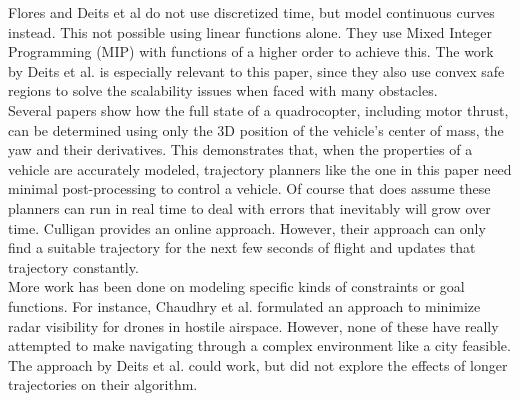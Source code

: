 Flores\cite{Flores2007} and Deits et al\cite{Deits2015} do not use discretized time, but model continuous curves instead. This not possible using linear functions alone. They use Mixed Integer Programming (MIP) with functions of a higher order to achieve this. The work by Deits et al. is especially relevant to this paper, since they also use convex safe regions to solve the scalability issues when faced with many obstacles. \\

Several papers \cite{Fliess1995a, Hao2005, Cowling2007, Mellinger2011} show how the full state of a quadrocopter, including motor thrust, can be determined using only the 3D position of the vehicle's center of mass, the yaw and their derivatives. This demonstrates that, when the properties of a vehicle are accurately modeled, trajectory planners like the one in this paper need minimal post-processing to control a vehicle. Of course that does assume these planners can run in real time to deal with errors that inevitably will grow over time. Culligan \cite{Culligan2006} provides an online approach. However, their approach can only find a suitable trajectory for the next few seconds of flight and updates that trajectory constantly. \\

More work has been done on modeling specific kinds of constraints or goal functions. For instance, Chaudhry et al. \cite{Chaudhry2004} formulated an approach to minimize radar visibility for drones in hostile airspace. However, none of these have really attempted to make navigating through a complex environment like a city feasible. The approach by Deits et al. \cite{Deits2015} could work, but did not explore the effects of longer trajectories on their algorithm.